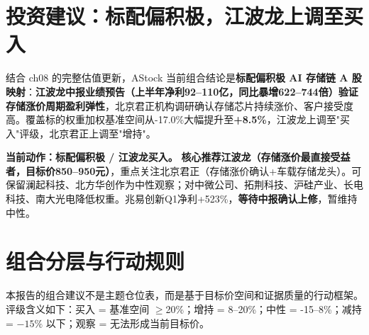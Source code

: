 
\section{投资建议：标配偏积极，江波龙上调至买入}

结合 ch08 的完整估值更新，AStock 当前组合结论是\textbf{标配偏积极 AI 存储链 A 股映射}：\textbf{江波龙中报业绩预告（上半年净利92--110亿，同比暴增622--744倍）验证存储涨价周期盈利弹性}，北京君正机构调研确认存储芯片持续涨价、客户接受度高。覆盖标的权重加权基准空间从-17.0\%大幅提升至\textbf{+8.5\%}，江波龙上调至"买入"评级，北京君正上调至"增持"。

\begin{riskbox}[组合建议]
\textbf{当前动作：标配偏积极 / 江波龙买入。} \textbf{核心推荐江波龙（存储涨价最直接受益者，目标价850--950元）}，重点关注北京君正（存储涨价确认+车载存储龙头）。可保留澜起科技、北方华创作为中性观察；对中微公司、拓荆科技、沪硅产业、长电科技、南大光电降低权重。兆易创新Q1净利+523\%，\textbf{等待中报确认上修}，暂维持中性。
\end{riskbox}

\section{组合分层与行动规则}

本报告的组合建议不是主题仓位表，而是基于目标价空间和证据质量的行动框架。评级含义如下：买入 = 基准空间 \(\geq\)20\%；增持 = 8--20\%；中性 = -15--8\%；减持 = \(-15\%\) 以下；观察 = 无法形成当前目标价。

